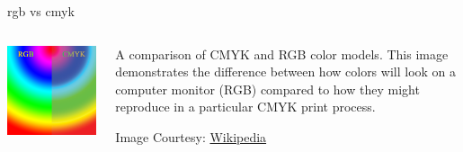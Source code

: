 \documentclass[aspectratio=169,xcolor={dvipsnames,svgnames}]{beamer}
\begin{document}
\begin{frame}[label={sec:org18a3fdb}]{rgb vs cmyk}
\begin{columns}
\begin{column}{.5\columnwidth}
\begin{center}
\includegraphics[width=.9\linewidth]{images/RGB_and_CMYK_comparison.png}
\end{center}
\end{column}

\begin{column}{.5\columnwidth}
A comparison of CMYK and RGB color models. This image
demonstrates the difference between how colors will
look on a computer monitor (RGB) compared to how they
might reproduce in a particular CMYK print process.

\vspace{\baselineskip}

Image Courtesy: \href{https://commons.wikimedia.org/wiki/File:RGB\_and\_CMYK\_comparison.png}{Wikipedia}
\end{column}
\end{columns}
\end{frame}
\end{document}
